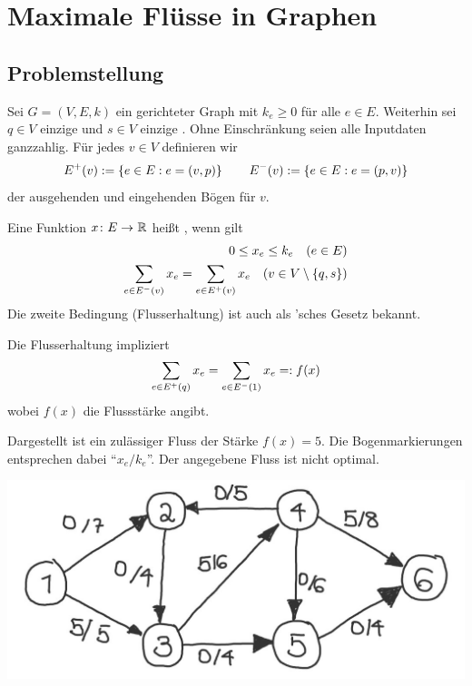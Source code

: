 \section{Maximale Flüsse in Graphen}

\subsection{Problemstellung}

Sei $G = (V,E,k)$ ein gerichteter Graph mit  $k_e \ge 0$ für alle $e \in E$. Weiterhin sei $q \in V$ einzige  und $s \in V$ einzige . Ohne Einschränkung seien alle Inputdaten ganzzahlig. Für jedes $v \in V$ definieren wir
\begin{equation*}
	E^+(v) \mathrel{:=} \left\{ e \in E : e = (v,p) \right\} \qquad E^-(v) \mathrel{:=} \left\{ e \in E : e = (p,v) \right\}
\end{equation*}
der ausgehenden und eingehenden Bögen für $v$.

\begin{definition}
	Eine Funktion $\abb{x}{E}{\R}$ heißt , wenn gilt
	\begin{equation*}
		\begin{aligned}
			0 \le x_e \le k_e \quad (e \in E) \\
			\sum_{e \in E^-(v)} x_e = \sum_{e \in E^+(v)} x_e \quad (v \in V \setminus \left\{ q,s \right\})
		\end{aligned}
	\end{equation*}
	Die zweite Bedingung (Flusserhaltung) ist auch als 'sches Gesetz bekannt.
\end{definition}

Die Flusserhaltung impliziert 
\begin{equation*}
	\sum_{e \in E^+(q)} x_e = \sum_{e \in E^-(1)} x_e \mathrel{=:} f(x)
\end{equation*}
wobei $f(x)$ die Flussstärke angibt.

\begin{beispiel} \label{beispiel: 5.3}
	Dargestellt ist ein zulässiger Fluss der Stärke $f(x) = 5$. Die Bogenmarkierungen entsprechen dabei \enquote{$x_e / k_e$}. Der angegebene Fluss ist nicht optimal.

	\begin{center}
		\includegraphics[width=.5\linewidth]{./optinum_abb/optinum_5_4_bsp5-3.jpg}
	\end{center}
\end{beispiel}

